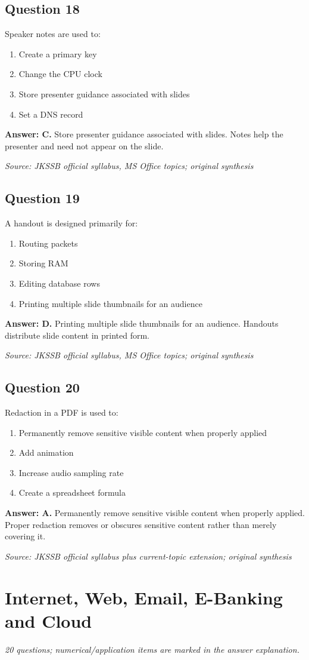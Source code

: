\documentclass[11pt,a4paper]{book}
\newcommand{\source}[1]{\par\smallskip\textit{Source: #1}}
\newcommand{\answer}[2]{\par\textbf{Answer: #1.} #2}
\begin{document}
\section*{Question 18}
Speaker notes are used to:
\begin{enumerate}[label=\Alph*.]
\item Create a primary key
\item Change the CPU clock
\item Store presenter guidance associated with slides
\item Set a DNS record
\end{enumerate}
\answer{C}{Store presenter guidance associated with slides. Notes help the presenter and need not appear on the slide.}
\source{JKSSB official syllabus, MS Office topics; original synthesis}
\section*{Question 19}
A handout is designed primarily for:
\begin{enumerate}[label=\Alph*.]
\item Routing packets
\item Storing RAM
\item Editing database rows
\item Printing multiple slide thumbnails for an audience
\end{enumerate}
\answer{D}{Printing multiple slide thumbnails for an audience. Handouts distribute slide content in printed form.}
\source{JKSSB official syllabus, MS Office topics; original synthesis}
\section*{Question 20}
Redaction in a PDF is used to:
\begin{enumerate}[label=\Alph*.]
\item Permanently remove sensitive visible content when properly applied
\item Add animation
\item Increase audio sampling rate
\item Create a spreadsheet formula
\end{enumerate}
\answer{A}{Permanently remove sensitive visible content when properly applied. Proper redaction removes or obscures sensitive content rather than merely covering it.}
\source{JKSSB official syllabus plus current-topic extension; original synthesis}

\chapter{Internet, Web, Email, E-Banking and Cloud}
\textit{20 questions; numerical/application items are marked in the answer explanation.}
\end{document}

